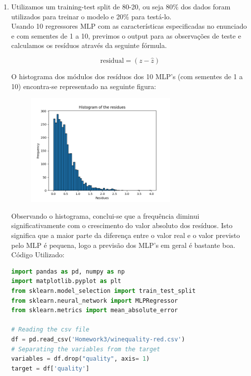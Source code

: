 \documentclass[a4paper,12pt]{article} %
\begin{document}
\begin{enumerate}

\item Utilizamos um training-test split de 80-20, ou seja 80\% dos dados foram utilizados para treinar o modelo e 20\% para testá-lo.\\ 
Usando 10 regressores MLP com as características especificadas no enunciado e com sementes de 1 a 10, 
previmos o output para as observações de teste e calculamos os resíduos através da seguinte fórmula.

\begin{equation}
    \text{residual} = (z - \hat{z})
\end{equation}

O histograma dos módulos dos resíduos dos 10 MLP's (com sementes de 1 a 10) encontra-se representado na seguinte figura:

\begin{figure}[H]
    \centering
    \includegraphics[width=0.7\textwidth]{ex1_histogram.png}
\end{figure}

Observando o histograma, conclui-se que a frequência diminui significativamente 
com o crescimento do valor absoluto dos resíduos. Isto significa que a maior parte
da diferença entre o valor real e o valor previsto pelo MLP é pequena, logo a previsão
dos MLP's em geral é bastante boa.\\

Código Utilizado:

\begin{lstlisting}[language=Python]
import pandas as pd, numpy as np
import matplotlib.pyplot as plt
from sklearn.model_selection import train_test_split
from sklearn.neural_network import MLPRegressor
from sklearn.metrics import mean_absolute_error

# Reading the csv file
df = pd.read_csv('Homework3/winequality-red.csv')
# Separating the variables from the target
variables = df.drop("quality", axis= 1)
target = df['quality']


\end{lstlisting}
\end{enumerate}
\end{document}
